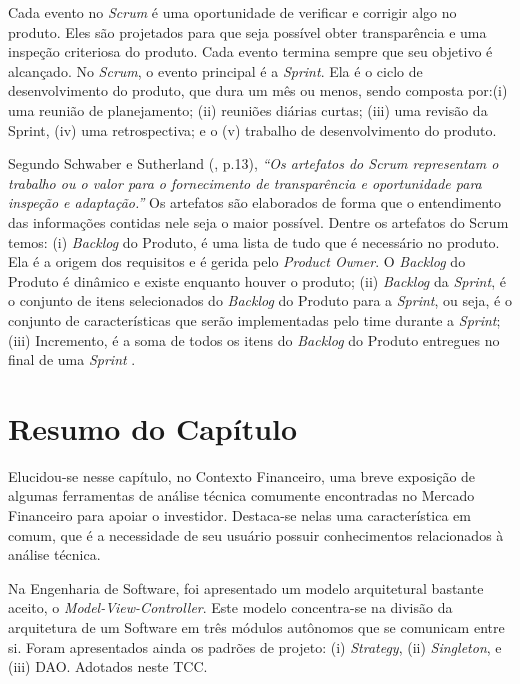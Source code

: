 Cada evento no \textit{Scrum} é uma oportunidade de verificar e corrigir algo no produto. Eles são projetados para que seja possível obter transparência e uma inspeção criteriosa do produto. Cada evento termina sempre que seu objetivo é alcançado. No \textit{Scrum}, o evento principal é a \textit{Sprint}. Ela é o ciclo de desenvolvimento do produto, que dura um mês ou menos, sendo composta por:(i) uma reunião de planejamento; (ii) reuniões diárias curtas; (iii) uma revisão da Sprint, (iv) uma retrospectiva; e o  (v) trabalho de desenvolvimento do produto.

Segundo Schwaber e Sutherland (\citeyear{schwaber2013}, p.13), \textit{“Os artefatos do Scrum representam o trabalho ou o valor para o fornecimento de transparência e oportunidade para inspeção e adaptação.”} Os artefatos são elaborados de forma que o entendimento das informações contidas nele seja o maior possível. Dentre os artefatos do Scrum temos: (i) \textit{Backlog} do Produto, é uma lista de tudo que é necessário no produto. Ela é a origem dos requisitos e é gerida pelo \textit{Product Owner}. O \textit{Backlog} do Produto é dinâmico e existe enquanto houver o produto; (ii) \textit{Backlog} da \textit{Sprint}, é o conjunto de itens selecionados do \textit{Backlog} do Produto para a \textit{Sprint}, ou seja, é o conjunto de características que serão implementadas pelo time durante a \textit{Sprint}; (iii) Incremento, é a soma de todos os itens do \textit{Backlog} do Produto entregues no final de uma \textit{Sprint} \cite[p. 13-15]{schwaber2013}. 


\section{Resumo do Capítulo}

Elucidou-se nesse capítulo, no Contexto Financeiro, uma breve exposição de algumas ferramentas de análise técnica comumente encontradas no Mercado Financeiro para apoiar o investidor. Destaca-se nelas uma característica em comum, que é a necessidade de seu usuário possuir conhecimentos relacionados à análise técnica. 

Na Engenharia de Software, foi apresentado um modelo arquitetural bastante aceito, o \textit{Model-View-Controller}. Este modelo concentra-se na divisão da arquitetura de um Software em três módulos autônomos que se comunicam entre si. Foram apresentados ainda os padrões de projeto: (i) \textit{Strategy}, (ii) \textit{Singleton}, e (iii) DAO. Adotados neste TCC. 

